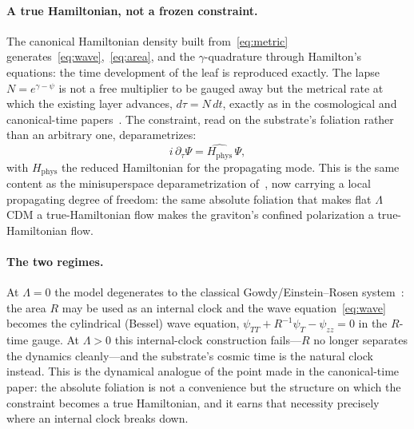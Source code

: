 \documentclass[11pt,a4paper]{article}
\theoremstyle{plain}
\theoremstyle{definition}
\theoremstyle{remark}
\newcommand{\Hphys}{H_{\mathrm{phys}}}
\begin{document}
\paragraph{A true Hamiltonian, not a frozen constraint.}
The canonical Hamiltonian density built from~\eqref{eq:metric} generates~\eqref{eq:wave},~\eqref{eq:area}, and the $\gamma$-quadrature through Hamilton's equations: the time development of the leaf is reproduced exactly. The lapse $N=e^{\gamma-\psi}$ is not a free multiplier to be gauged away but the metrical rate at which the existing layer advances, $d\tau=N\,dt$, exactly as in the cosmological and canonical-time papers~\cite{JanzenCRframework,JanzenCanonicalTime}. The constraint, read on the substrate's foliation rather than an arbitrary one, deparametrizes:
\begin{equation}
i\,\partial_\tau \Psi = \hat{\Hphys}\,\Psi,
\end{equation}
with $\Hphys$ the reduced Hamiltonian for the propagating mode. This is the same content as the minisuperspace deparametrization of~\cite{JanzenCanonicalTime}, now carrying a local propagating degree of freedom: the same absolute foliation that makes flat $\Lambda$CDM a true-Hamiltonian flow makes the graviton's confined polarization a true-Hamiltonian flow.

\paragraph{The two regimes.}
At $\Lambda=0$ the model degenerates to the classical Gowdy/Einstein--Rosen system~\cite{Gowdy1974,EinsteinRosen1937}: the area $R$ may be used as an internal clock and the wave equation~\eqref{eq:wave} becomes the cylindrical (Bessel) wave equation, $\psi_{TT}+R^{-1}\psi_T-\psi_{zz}=0$ in the $R$-time gauge. At $\Lambda>0$ this internal-clock construction fails---$R$ no longer separates the dynamics cleanly---and the substrate's cosmic time is the natural clock instead. This is the dynamical analogue of the point made in the canonical-time paper: the absolute foliation is not a convenience but the structure on which the constraint becomes a true Hamiltonian, and it earns that necessity precisely where an internal clock breaks down.
\end{document}
